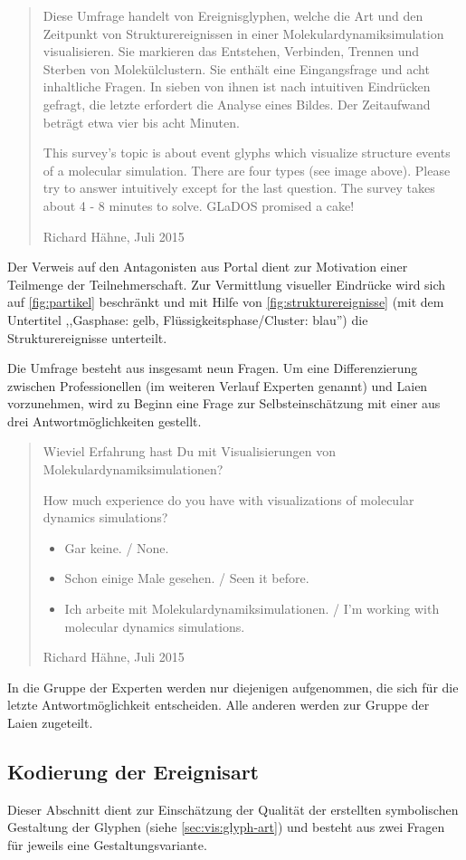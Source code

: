 \blockquote[Richard Hähne, Juli 2015]{
Diese Umfrage handelt von Ereignisglyphen, welche die Art und den Zeitpunkt von Strukturereignissen in einer Molekulardynamiksimulation visualisieren. Sie markieren das Entstehen, Verbinden, Trennen und Sterben von Molekülclustern. Sie enthält eine Eingangsfrage und acht inhaltliche Fragen. In sieben von ihnen ist nach intuitiven Eindrücken gefragt, die letzte erfordert die Analyse eines Bildes. Der Zeitaufwand beträgt etwa vier bis acht Minuten.

This survey's topic is about event glyphs which visualize structure events of a molecular simulation. There are four types (see image above). Please try to answer intuitively except for the last question. The survey takes about 4 - 8 minutes to solve. GLaDOS promised a cake!}

Der Verweis auf den Antagonisten aus Portal dient zur Motivation einer Teilmenge der Teilnehmerschaft. Zur Vermittlung visueller Eindrücke wird sich auf \autoref{fig:partikel} beschränkt und mit Hilfe von \autoref{fig:strukturereignisse} (mit dem Untertitel ,,Gasphase: gelb, Flüssigkeitsphase/Cluster: blau'') die Strukturereignisse unterteilt.

Die Umfrage besteht aus insgesamt neun Fragen. Um eine Differenzierung zwischen Professionellen (im weiteren Verlauf Experten genannt) und Laien vorzunehmen, wird zu Beginn eine Frage zur Selbsteinschätzung mit einer aus drei Antwortmöglichkeiten gestellt.

\blockquote[Richard Hähne, Juli 2015]{
	Wieviel Erfahrung hast Du mit Visualisierungen von Molekulardynamiksimulationen?
	
	How much experience do you have with visualizations of molecular dynamics simulations?
	
	\begin{itemize}
		\item Gar keine. / None.
		\item Schon einige Male gesehen. / Seen it before.
		\item Ich arbeite mit Molekulardynamiksimulationen. / I'm working with molecular dynamics simulations.
	\end{itemize}
}

In die Gruppe der Experten werden nur diejenigen aufgenommen, die sich für die letzte Antwortmöglichkeit entscheiden. Alle anderen werden zur Gruppe der Laien zugeteilt.

\subsection*{Kodierung der Ereignisart}\label{sec:umfrage:art}
Dieser Abschnitt dient zur Einschätzung der Qualität der erstellten symbolischen Gestaltung der Glyphen (siehe \autoref{sec:vis:glyph-art}) und besteht aus zwei Fragen für jeweils eine Gestaltungsvariante.

